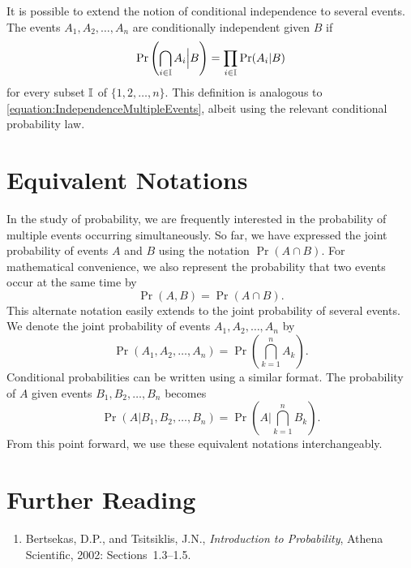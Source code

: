 It is possible to extend the notion of conditional independence to several events.
The events $A_1, A_2, \ldots, A_n$ are conditionally independent given $B$ if
\begin{equation*}
\Pr \left( \bigcap_{i \in \mathbb{I}} A_i \Big| B \right)
= \prod_{i \in \mathbb{I}} \Pr (A_i | B)
\end{equation*}
for every subset $\mathbb{I}$ of $\{1, 2, \ldots, n\}$.
This definition is analogous to \eqref{equation:IndependenceMultipleEvents}, albeit using the relevant conditional probability law.


\section{Equivalent Notations}

In the study of probability, we are frequently interested in the probability of multiple events occurring simultaneously.
So far, we have expressed the joint probability of events $A$ and $B$ using the notation $\Pr (A \cap B)$.
For mathematical convenience, we also represent the probability that two events occur at the same time by
\begin{equation*}
\Pr (A, B) = \Pr (A \cap B) .
\end{equation*}
This alternate notation easily extends to the joint probability of several events.
We denote the joint probability of events $A_1, A_2, \ldots, A_n$ by
\begin{equation*}
\Pr (A_1, A_2, \ldots, A_n) =
\Pr \left( \bigcap_{k=1}^n A_k \right) .
\end{equation*}
Conditional probabilities can be written using a similar format.
The probability of $A$ given events $B_1, B_2, \ldots, B_n$ becomes
\begin{equation*}
\Pr (A | B_1, B_2, \ldots, B_n) =
\Pr \left( A \bigg| \bigcap_{k=1}^n B_k \right) .
\end{equation*}
From this point forward, we use these equivalent notations interchangeably.


\section*{Further Reading}

\begin{small}
\begin{enumerate}
\item Bertsekas, D.P., and Tsitsiklis, J.N., \emph{Introduction to Probability}, Athena Scientific, 2002: Sections~1.3--1.5.
\end{enumerate}
\end{small}

